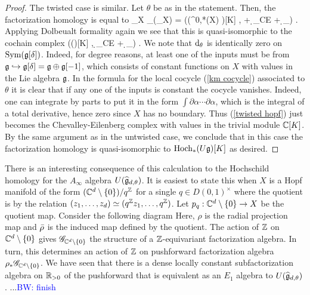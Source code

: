 \documentclass[10pt]{amsart}
\def\brian{\textcolor{blue}{BW: }\textcolor{blue}}
\begin{document}
\begin{proof}
The twisted case is similar. 
Let $\theta$ be as in the statement.
Then, the factorization homology is equal to
\ben
\int_X \UU_\theta (\sG_X) = \left(\Sym(\Omega^{0,*}(X) \tensor \fg)[K] , \dbar + \d_{CE} + \d_\theta\right) .
\een
Applying Dolbeualt formality again we see that this is quasi-isomorphic to the cochain complex
\be\label{twisted hopf}
\left(\Sym(\fg[\delta])[K] ,  \d_{CE} + \d_\theta \right) .
\ee
We note that ${\rm d}_\theta$ is identically zero on ${\rm Sym}(\mathfrak g[\delta])$. 
Indeed, for degree reasons, at least one of the inputs must be from $\mathfrak g \hookrightarrow \mathfrak g[\delta] = \mathfrak g \oplus \mathfrak g[-1]$, which consists of constant functions on $X$ with values in the Lie algebra $\mathfrak g$. 
In the formula for the local cocycle (\ref{km cocycle}) associated to $\theta$ it is clear that if any one of the inputs is constant the cocycle vanishes. 
Indeed, one can integrate by parts to put it in the form $\int \partial \alpha \cdots \partial \alpha$, which is the integral of a total derivative, hence zero since $X$ has no boundary.
Thus (\ref{twisted hopf}) just becomes the Chevalley-Eilenberg complex with values in the trivial module $\mathbb C[K]$. 
By the same argument as in the untwisted case, we conclude that in this case the factorization homology is quasi-isomorphic to ${\rm Hoch}_*(U \mathfrak g)[K]$ as desired.
\end{proof}

There is an interesting consequence of this calculation to the Hochschild homology for the $A_\infty$ algebra $U(\widehat{\mathfrak g}_{d,\theta})$.
It is easiest to state this when $X$ is a Hopf manifold of the form $(\mathbb C^d \setminus \{0\}) / q^\mathbb Z$ for a single $q \in D(0,1)^\times$ where the quotient is by the relation $(z_1,\ldots,z_d) \simeq (q^\mathbb Z z_1,\ldots,q^\mathbb Z)$.
Let $p_q :  \mathbb C^d \setminus \{0\} \to X$ be the quotient map.
Consider the following diagram
\ben
{}
\een
Here, $\rho$ is the radial projection map and $\Bar{\rho}$ is the induced map defined by the quotient.
The action of $\mathbb Z$ on $\mathbb C^d \setminus\{0\}$ gives $\mathscr G_{\mathbb C^d \setminus \{0\}}$ the structure of a $\mathbb Z$-equivariant factorization algebra. 
In turn, this determines an action of $\mathbb Z$ on pushforward factorization algebra $\rho_* \mathscr G_{\mathbb C^d \setminus \{0\}}$.
We have seen that there is a dense locally constant subfactorization algebra on $\mathbb R_{>0}$ of the pushforward that is equivalent as an $E_1$ algebra to $U(\widehat{\mathfrak g}_{d,\theta})$. ...\brian{finish}
\end{document}
